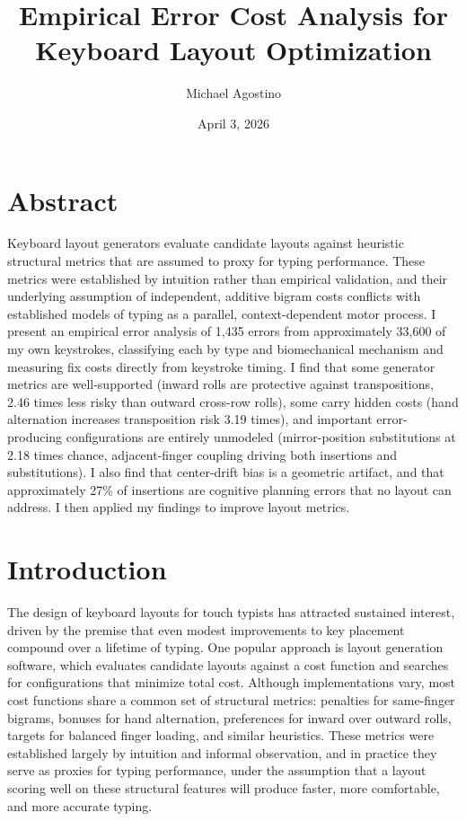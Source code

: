 \documentclass[12pt]{article}
\title{Empirical Error Cost Analysis for Keyboard Layout Optimization}
\author{Michael Agostino}
\date{April 3, 2026}
\begin{document}
\maketitle

\section{Abstract}

Keyboard layout generators evaluate candidate layouts against heuristic structural metrics that are assumed to proxy for typing performance. These metrics were established by intuition rather than empirical validation, and their underlying assumption of independent, additive bigram costs conflicts with established models of typing as a parallel, context-dependent motor process. I present an empirical error analysis of 1,435 errors from approximately 33,600 of my own keystrokes, classifying each by type and biomechanical mechanism and measuring fix costs directly from keystroke timing. I find that some generator metrics are well-supported (inward rolls are protective against transpositions, 2.46 times less risky than outward cross-row rolls), some carry hidden costs (hand alternation increases transposition risk 3.19 times), and important error-producing configurations are entirely unmodeled (mirror-position substitutions at 2.18 times chance, adjacent-finger coupling driving both insertions and substitutions). I also find that center-drift bias is a geometric artifact, and that approximately 27\% of insertions are cognitive planning errors that no layout can address. I then applied my findings to improve layout metrics.

\section{Introduction}

The design of keyboard layouts for touch typists has attracted sustained interest, driven by the premise that even modest improvements to key placement compound over a lifetime of typing. One popular approach is layout generation software, which evaluates candidate layouts against a cost function and searches for configurations that minimize total cost. Although implementations vary, most cost functions share a common set of structural metrics: penalties for same-finger bigrams, bonuses for hand alternation, preferences for inward over outward rolls, targets for balanced finger loading, and similar heuristics. These metrics were established largely by intuition and informal observation, and in practice they serve as proxies for typing performance, under the assumption that a layout scoring well on these structural features will produce faster, more comfortable, and more accurate typing.
\end{document}
